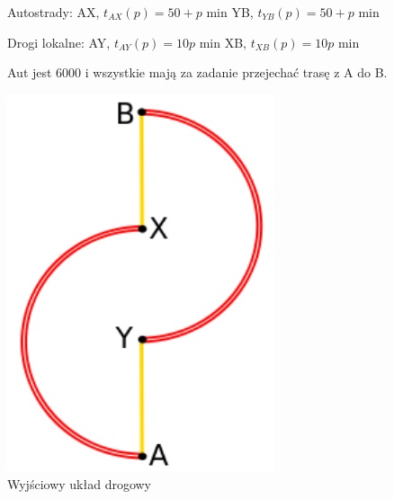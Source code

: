 \documentclass[twoside,12pt]{report}
\begin{document}
\vspace*{10px}
\begin{figure}[h]
\begin{flushleft}
\begin{minipage}{.50\textwidth}
Autostrady:\newline
AX, $t_{AX}(p) =  50 + p$ min\newline
YB, $t_{YB}(p) =  50 + p$ min\newline

\vspace*{20px}
Drogi lokalne:\newline
AY, $t_{AY}(p) =  10p$ min\newline
XB, $t_{XB}(p) =  10p$ min\newline

\vspace*{20px}
Aut jest 6000 i wszystkie mają za zadanie przejechać trasę z A do B.
\end{minipage}%
\end{flushleft}
\begin{flushright}
	\begin{minipage}{.50\textwidth}
	\centering
	\includegraphics[width=0.7\textwidth]{img/braess1}
	\caption{Wyjściowy układ drogowy}
	\end{minipage}
\end{flushright}
\end{figure}
\end{document}
